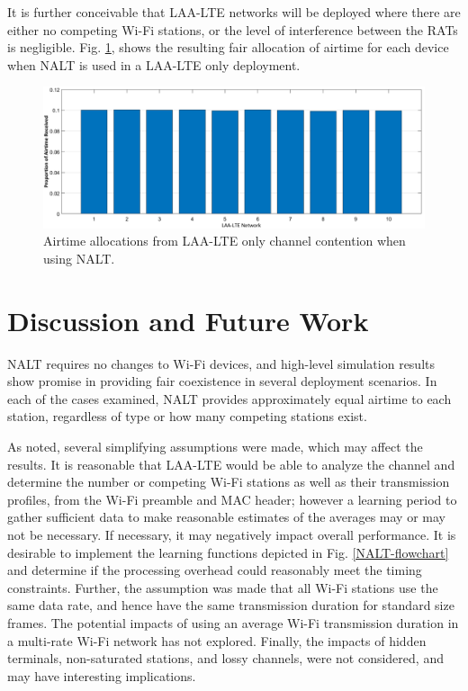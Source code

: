 It is further conceivable that LAA-LTE networks will be deployed where there are either no competing Wi-Fi stations, or the level of interference between the RATs is negligible.  Fig. \ref{NALT-only-results}, shows the resulting fair allocation of airtime for each device when NALT is used in a LAA-LTE only deployment. 
\begin{figure}[H]
	\includegraphics[width=\textwidth]{figures3/LAAonly}
	\caption{Airtime allocations from LAA-LTE only channel contention when using NALT.}
	\label{NALT-only-results}
\end{figure}

\section{Discussion and Future Work}
\label{future-work}
NALT requires no changes to \mbox{Wi-Fi} devices, and high-level simulation results show promise in providing fair coexistence in several deployment scenarios.  In each of the cases examined, NALT provides approximately equal airtime to each station, regardless of type or how many competing stations exist.  

As noted, several simplifying assumptions were made, which may affect the results.  It is reasonable that \mbox{LAA-LTE} would be able to analyze the channel and determine the number or competing \mbox{Wi-Fi} stations as well as their transmission profiles, from the \mbox{Wi-Fi} preamble and MAC header; however a learning period to gather sufficient data to make reasonable estimates of the averages may or may not be necessary.  If necessary, it may negatively impact overall performance. It is desirable to implement the learning functions depicted in Fig. \ref{NALT-flowchart} and determine if the processing overhead could reasonably meet the timing constraints. Further, the assumption was made that all \mbox{Wi-Fi} stations use the same data rate, and hence have the same transmission duration for standard size frames.  The potential impacts of using an average \mbox{Wi-Fi} transmission duration in a multi-rate \mbox{Wi-Fi} network has not explored.   Finally, the impacts of hidden terminals, non-saturated stations, and lossy channels, were not considered, and may have interesting implications. 


